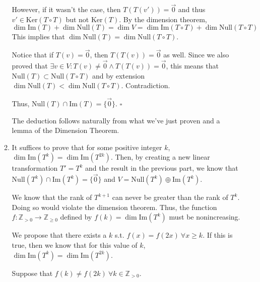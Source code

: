 \documentclass[12pt]{article}
\begin{document}
\begin{enumerate}
\begin{enumerate}
                        However, if it wasn't the case, then $T(T(v'))=\vec{0}$ and thus $v' \in \text{Ker}(T \circ T)$ but not $\text{Ker}(T)$.
                        By the dimension theorem, \[\dim \text{Im}(T)+\dim \text{Null}(T)=\dim V=\dim \text{Im}(T \circ T)+\dim \text{Null}(T \circ T)\]
                        This implies that $\dim \text{Null}(T)=\dim \text{Null}(T \circ T)$.

                        Notice that if $T(v)=\vec{0}$, then $T(T(v))=\vec{0}$ as well.
                        Since we also proved that $\exists v \in V: T(v) \ne \vec{0} \land T(T(v))=\vec{0}$,
                        this means that $\text{Null}(T) \subset \text{Null}(T \circ T)$ and by
                        extension $\dim \text{Null}(T) <\dim \text{Null}(T \circ T)$.
                        Contradiction.

                        Thus, $\text{Null}(T) \cap \text{Im}(T)=\{\vec{0}\}$. $\square$

                        The deduction follows naturally from what we've just proven and a lemma of the Dimension Theorem.
                  \item It suffices to prove that for some positive integer $k$, $\dim \text{Im}(T^k)=\dim \text{Im}(T^{2k})$.
                        Then, by creating a new linear transformation $T'=T^k$ and the result in the previous part, we know that
                        $\text{Null}(T^k) \cap \text{Im}(T^k) = \{\vec{0}\}$ and $V=\text{Null}(T^k) \oplus \text{Im}(T^k)$.

                        We know that the rank of $T^{k+1}$ can never be greater than the rank of $T^k$.
                        Doing so would violate the dimension theorem.
                        Thus, the function $f: \mathbb{Z}_{>0} \rightarrow \mathbb{Z}_{\ge 0}$
                        defined by $f(k)=\dim \text{Im}(T^{k})$ must be nonincreasing.

                        We propose that there exists a $k$ s.t. $f(x)=f(2x)\ \forall x \ge k$.
                        If this is true, then we know that for this value of $k$,
                        $\dim \text{Im}(T^k)=\dim \text{Im}(T^{2k})$.

                        Suppose that $f(k) \ne f(2k)\ \forall k \in \mathbb{Z}_{>0}$.


\end{enumerate}
\end{enumerate}
\end{document}
